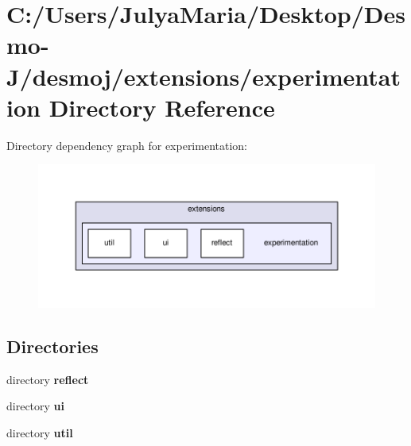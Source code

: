 \section{C\-:/\-Users/\-Julya\-Maria/\-Desktop/\-Desmo-\/\-J/desmoj/extensions/experimentation Directory Reference}
\label{dir_448a333152e6a63bababc49467baa141}
Directory dependency graph for experimentation\-:
\nopagebreak
\begin{figure}[H]
\begin{center}
\leavevmode
\includegraphics[width=350pt]{dir_448a333152e6a63bababc49467baa141_dep}
\end{center}
\end{figure}
\subsection*{Directories}
\begin{DoxyCompactItemize}
\item 
directory {\bf reflect}
\item 
directory {\bf ui}
\item 
directory {\bf util}
\end{DoxyCompactItemize}
